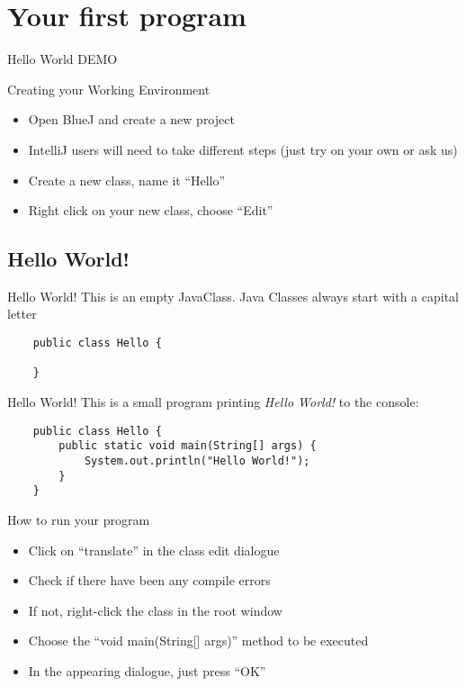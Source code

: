 \section{Your first program}
\begin{frame}{Hello World}
  DEMO
\end{frame}

\begin{frame}[fragile]{Creating your Working Environment}
  \begin{itemize}
  	\item Open BlueJ and create a new project\\
  		\item IntelliJ users will need to take different steps (just try on your own or ask us)
  	\item Create a new class, name it ``Hello''
  	\item Right click on your new class, choose ``Edit''
  \end{itemize}
\end{frame}

\subsection{Hello World!}

\begin{frame}[fragile]{Hello World!}
	This is an empty JavaClass.
  Java Classes always start with a capital letter
	\begin{lstlisting}
	public class Hello {

	}
	\end{lstlisting}
\end{frame}

\begin{frame}[fragile]{Hello World!}
	This is a small program printing \emph{Hello World!} to the console:
	\begin{lstlisting}
	public class Hello {
	    public static void main(String[] args) {
	        System.out.println("Hello World!");
	    }
	}
	\end{lstlisting}
\end{frame}

\begin{frame}[fragile]{How to run your program}
   \begin{itemize}
  	\item Click on ``translate'' in the class edit dialogue
  	\item Check if there have been any compile errors
  	\item If not, right-click the class in the root window
  	\item Choose the ``void main(String[] args)'' method to be executed
  	\item In the appearing dialogue, just press ``OK''
  \end{itemize}
\end{frame}

